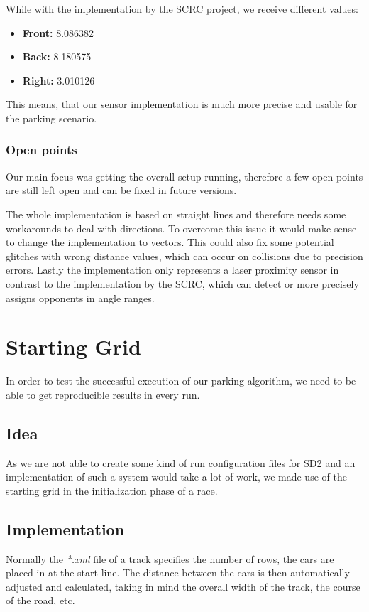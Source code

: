 \documentclass[paper=a4, fontsize=11pt]{scrreprt}
\begin{document}
While with the implementation by the SCRC project,
we receive different values:
\begin{itemize}
  \item \textbf{Front:} 8.086382
  \item \textbf{Back:} 8.180575
  \item \textbf{Right:} 3.010126
\end{itemize}

This means, that our sensor implementation is much more precise
and usable for the parking scenario.

\subsubsection{Open points}
Our main focus was getting the overall setup running,
therefore a few open points are still left open
and can be fixed in future versions.

The whole implementation is based on straight lines
and therefore needs some workarounds to deal with directions.
To overcome this issue it would make sense to change the implementation to vectors.
This could also fix some potential glitches with wrong distance values,
which can occur on collisions due to precision errors.
Lastly the implementation only represents a laser proximity sensor
in contrast to the implementation by the SCRC,
which can detect or more precisely assigns opponents in angle ranges.

\section{Starting Grid}
In order to test the successful execution of our parking algorithm,
we need to be able to get reproducible results in every run.

\subsection{Idea}
As we are not able to create some kind of run configuration files for SD2
and an implementation of such a system would take a lot of work,
we made use of the starting grid in the initialization phase of a race.

\subsection{Implementation}
Normally the \textit{*.xml} file of a track specifies the number of rows,
the cars are placed in at the start line.
The distance between the cars is then automatically adjusted and calculated,
taking in mind the overall width of the track, the course of the road, etc.
\end{document}
